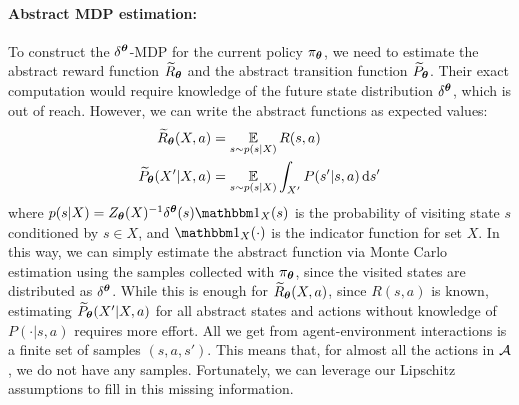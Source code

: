 \paragraph{Abstract MDP estimation:}\label{sec:mdpest}
To construct the $\delta^{\boldsymbol{\theta}}$-MDP for the current policy $\pi_{\boldsymbol{\theta}}$, we need to estimate the abstract reward function $\widetilde{R}_{\boldsymbol{\theta}}$ and the abstract transition function $\widetilde{P}_{\boldsymbol{\theta}}$. Their exact computation would require knowledge of the future state distribution $\delta^{\boldsymbol{\theta}}$, which is out of reach. %
However, we can write the abstract functions as expected values:
\begin{align}
\widetilde{R}_{\boldsymbol{\theta}}(X, a) &= \operatorname*{\mathbb{E}}_{s \sim p(s | X)} R(s, a) \label{eq:mcr}\\
\widetilde{P}_{\boldsymbol{\theta}}(X' | X, a) &= \operatorname*{\mathbb{E}}_{s \sim p(s | X)} \int_{X'} P(s' | s, a) \,\mathrm{d} s'\label{eq:mcp}
\end{align}
where $p(s | X) = Z_{\vtheta}(X)^{-1}\delta^{\vtheta}(s)\Ind_X(s)$ is the probability of visiting state $s$ conditioned by $s\in X$, and $\Ind_X(\cdot)$ is the indicator function for set $X$.
In this way, we can simply estimate the abstract function via Monte Carlo estimation using the samples collected with $\pi_{\boldsymbol{\theta}}$, since the visited states are distributed as $\delta^{\boldsymbol{\theta}}$.
While this is enough for $\widetilde{R}_{\boldsymbol{\theta}}(X, a)$, since $R(s, a)$ is known, estimating $\widetilde{P}_{\boldsymbol{\theta}}(X'|X, a)$ for all abstract states and actions without knowledge of $P(\cdot|s, a)$ requires more effort. All we get from agent-environment interactions is a finite set of samples $(s,a,s')$. This means that, for almost all the actions in $\mathcal{A}$, we do not have any samples. Fortunately, we can leverage our Lipschitz assumptions to fill in this missing information.
